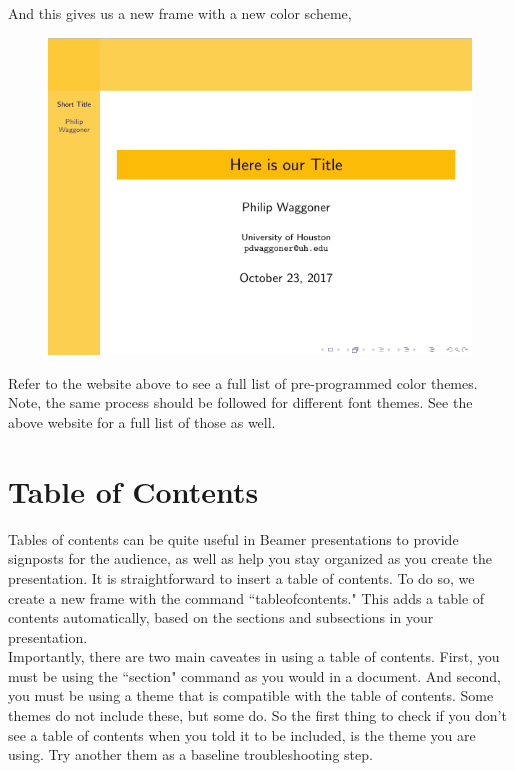 \documentclass[11pt]{article}
\newcommand{\forceindent}{\leavevmode{\parindent=1.5em\indent}} %
\begin{document}
And this gives us a new frame with a new color scheme,

\begin{figure}[!h]
	\includegraphics[scale=.5]{OUT4}
	\centering
\end{figure}

\newpage

Refer to the website above to see a full list of pre-programmed color themes. Note, the same process should be followed for different font themes. See the above website for a full list of those as well. 

\newpage

\section{Table of Contents}

\forceindent Tables of contents can be quite useful in Beamer presentations to provide signposts for the audience, as well as help you stay organized as you create the presentation. It is straightforward to insert a table of contents. To do so, we create a new frame with the command ``tableofcontents." This adds a table of contents automatically, based on the sections and subsections in your presentation. \\

Importantly, there are two main caveates in using a table of contents. First, you must be using the ``section" command as you would in a document. And second, you must be using a theme that is compatible with the table of contents. Some themes do not include these, but some do. So the first thing to check if you don't see a table of contents when you told it to be included, is the theme you are using. Try another them as a baseline troubleshooting step. \\
\end{document}
